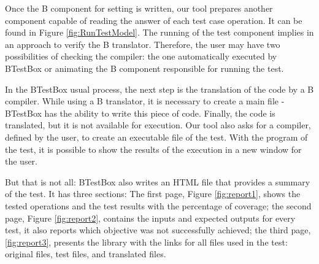 \documentclass[runningheads]{llncs}
\begin{document}
Once the B component for setting is written, our tool prepares another component capable of reading the answer of each test case operation. It can be found in Figure \ref{fig:RunTestModel}. The running of the test component implies in an approach to verify the B translator. Therefore, the user may have two possibilities of checking the compiler: the one automatically executed by BTestBox or animating the B component responsible for running the test.


In the BTestBox usual process, the next step is the translation of the code by a B compiler. While using a B translator, it is necessary to create a main file - BTestBox has the ability to write this piece of code. Finally, the code is translated, but it is not available for execution. Our tool also asks for a compiler, defined by the user, to create an executable file of the test. With the program of the test, it is possible to show the results of the execution in a new window for the user.

But that is not all: BTestBox also writes an HTML file that provides a summary of the test. It has three sections: The first page, Figure \ref{fig:report1}, shows the tested operations and the test results with the percentage of coverage; the second page, Figure \ref{fig:report2}, contains the inputs and expected outputs for every test, it also reports which objective was not successfully achieved; the third page, \ref{fig:report3}, presents the library with the links for all files used in the test: original files, test files, and translated files. 
\end{document}
